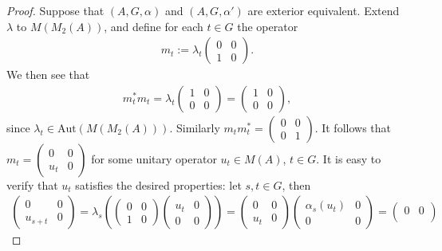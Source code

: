 \begin{proof}
Suppose that $(A, G , \alpha)$ and $(A,G,\alpha')$ are exterior equivalent. Extend $\lambda$ to $M(M_2(A))$, and define for each $t \in G$ the operator
\begin{align*}
	m_t:=\lambda_t\begin{pmatrix}
		0 & 0 \\
		1 & 0
	\end{pmatrix}.
\end{align*}
We then see that 
\begin{align*}
	m_t^* m_t = \lambda_{t} \begin{pmatrix}
		1 & 0 \\
		0 & 0 
	\end{pmatrix} =  \begin{pmatrix}
		1 & 0 \\
		0 & 0
	\end{pmatrix},
\end{align*}
since $\lambda_t \in \mathrm{Aut}(M(M_2(A)))$. Similarly $m_tm_t^* = \begin{pmatrix}
	0 & 0\\
	0 & 1
\end{pmatrix}$. It follows that $m_t = \begin{pmatrix}
	0 & 0 \\
	u_t & 0
\end{pmatrix}$
for some unitary operator $u_t \in M(A)$, $t \in G$. It is easy to verify that $u_t$ satisfies the desired properties: let $s,t \in G$, then
\begin{align*}
	\begin{pmatrix}
		0 & 0 \\
		u_{s+t} & 0
	\end{pmatrix}
	= \lambda_s\left( \begin{pmatrix}
		0 & 0 \\
		1 & 0
	\end{pmatrix} \begin{pmatrix}
		u_t & 0 \\
		0 & 0 
	\end{pmatrix}\right) =\begin{pmatrix}
		0 & 0 \\
		u_t & 0 
	\end{pmatrix}
	\begin{pmatrix}
		\alpha_s(u_t) & 0 \\
		0 & 0
	\end{pmatrix}
	=\begin{pmatrix}
		0 & 0 \\

\end{pmatrix}
\end{align*}
\end{proof}
